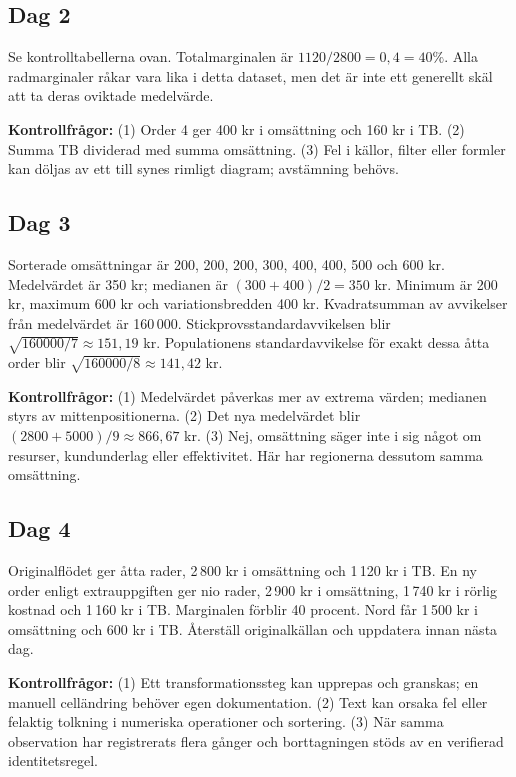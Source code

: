 \documentclass[11pt,a4paper]{article}
\begin{document}
\subsection{Dag 2}
Se kontrolltabellerna ovan. Totalmarginalen är \(1120/2800=0{,}4=40\%\). Alla radmarginaler råkar vara lika i detta dataset, men det är inte ett generellt skäl att ta deras oviktade medelvärde.

\textbf{Kontrollfrågor:} (1) Order 4 ger 400 kr i omsättning och 160 kr i TB. (2) Summa TB dividerad med summa omsättning. (3) Fel i källor, filter eller formler kan döljas av ett till synes rimligt diagram; avstämning behövs.

\subsection{Dag 3}
Sorterade omsättningar är 200, 200, 200, 300, 400, 400, 500 och 600 kr. Medelvärdet är 350 kr; medianen är \((300+400)/2=350\) kr. Minimum är 200 kr, maximum 600 kr och variationsbredden 400 kr. Kvadratsumman av avvikelser från medelvärdet är 160\,000. Stickprovsstandardavvikelsen blir \(\sqrt{160000/7}\approx151{,}19\) kr. Populationens standardavvikelse för exakt dessa åtta order blir \(\sqrt{160000/8}\approx141{,}42\) kr.

\textbf{Kontrollfrågor:} (1) Medelvärdet påverkas mer av extrema värden; medianen styrs av mittenpositionerna. (2) Det nya medelvärdet blir \((2800+5000)/9\approx866{,}67\) kr. (3) Nej, omsättning säger inte i sig något om resurser, kundunderlag eller effektivitet. Här har regionerna dessutom samma omsättning.

\subsection{Dag 4}
Originalflödet ger åtta rader, 2\,800 kr i omsättning och 1\,120 kr i TB. En ny order enligt extrauppgiften ger nio rader, 2\,900 kr i omsättning, 1\,740 kr i rörlig kostnad och 1\,160 kr i TB. Marginalen förblir 40 procent. Nord får 1\,500 kr i omsättning och 600 kr i TB. Återställ originalkällan och uppdatera innan nästa dag.

\textbf{Kontrollfrågor:} (1) Ett transformationssteg kan upprepas och granskas; en manuell celländring behöver egen dokumentation. (2) Text kan orsaka fel eller felaktig tolkning i numeriska operationer och sortering. (3) När samma observation har registrerats flera gånger och borttagningen stöds av en verifierad identitetsregel.
\end{document}
